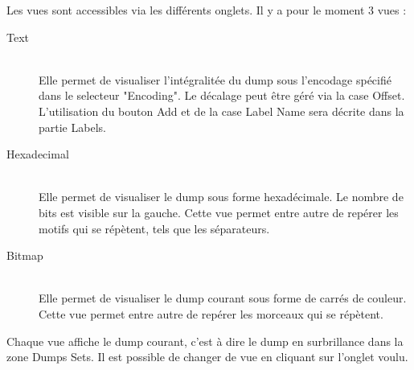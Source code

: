 Les vues sont accessibles via les différents onglets. Il y a pour le moment 3 vues :
\begin{description}
  \item[Text] \hfill \\
  Elle permet de visualiser l'intégralitée du dump sous l'encodage spécifié dans le selecteur "Encoding". Le décalage peut être géré via la case Offset. L'utilisation du bouton Add et de la case Label Name sera décrite dans la partie Labels.
  
  \item[Hexadecimal] \hfill \\
  Elle permet de visualiser le dump sous forme hexadécimale. Le nombre de bits est visible sur la gauche. Cette vue permet entre autre de repérer les motifs qui se répètent, tels que les séparateurs.

  \item[Bitmap] \hfill \\
  Elle permet de visualiser le dump courant sous forme de carrés de couleur. Cette vue permet entre autre de repérer les morceaux qui se répètent.
\end{description}

Chaque vue affiche le dump courant, c'est à dire le dump en surbrillance dans la zone Dumps Sets. Il est possible de changer de vue en cliquant sur l'onglet voulu.

